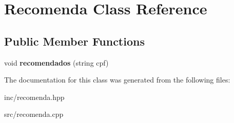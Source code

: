\hypertarget{class_recomenda}{}\section{Recomenda Class Reference}
\label{class_recomenda}
\subsection*{Public Member Functions}
\begin{DoxyCompactItemize}
\item 
\mbox{\label{class_recomenda_ac095a8cd9053b5e88808ff56198e4fd1}} 
void {\bfseries recomendados} (string cpf)
\end{DoxyCompactItemize}


The documentation for this class was generated from the following files\+:\begin{DoxyCompactItemize}
\item 
inc/recomenda.\+hpp\item 
src/recomenda.\+cpp\end{DoxyCompactItemize}
